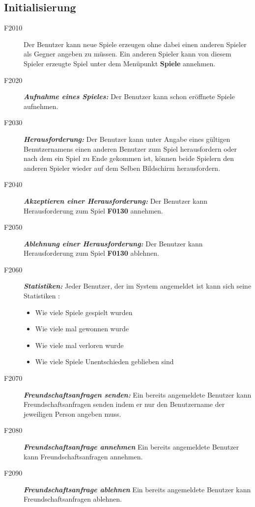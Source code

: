 \documentclass[parskip=full]{scrartcl}
\begin{document}
\subsection{Initialisierung}
\begin{description}
	\item[F2010] Der Benutzer kann neue Spiele erzeugen ohne dabei einen anderen \gls{Spieler} als Gegner angeben zu müssen. Ein anderen Spieler kann von diesem Spieler erzeugte Spiel unter dem Menüpunkt \textbf{Spiele} annehmen.
	\item[F2020] \textbf{\textit{Aufnahme eines Spieles: }} Der Benutzer kann schon eröffnete Spiele aufnehmen.
	\item[F2030] \textbf{\textit{Herausforderung: }} Der Benutzer kann unter Angabe eines gültigen Benutzernamens einen anderen Benutzer zum Spiel herausfordern oder nach dem ein Spiel zu Ende gekommen ist, können beide Spielern den anderen Spieler wieder auf dem Selben Bildschirm herausfordern.
	\item [F2040] \textbf{\textit{Akzeptieren einer Herausforderung: }} Der Benutzer kann Herausforderung zum Spiel \textbf{F0130} annehmen.
	\item [F2050] \textbf{\textit{Ablehnung einer Herausforderung: }} Der Benutzer kann Herausforderung zum Spiel \textbf{F0130} ablehnen.
	\item [F2060] \textbf{\textit{Statistiken: }} Jeder Benutzer, der im System angemeldet ist kann sich seine Statistiken :
	\begin{itemize}
		\item Wie viele Spiele gespielt wurden
		\item Wie viele mal gewonnen wurde
		\item Wie viele mal verloren wurde
		\item Wie viele Spiele Unentschieden geblieben sind
	\end{itemize}
	\item[F2070] \textbf{\textit{Freundschaftsanfragen senden: }}
	Ein bereits angemeldete Benutzer kann Freundschaftsanfragen senden indem er nur den Benutzername der jeweiligen Person angeben muss.
	\item[F2080] \textbf{\textit{Freundschaftsanfrage annehmen }} Ein bereits angemeldete Benutzer kann Freundschaftsanfragen annehmen.
	\item[F2090] \textbf{\textit{Freundschaftsanfrage ablehnen }} Ein bereits angemeldete Benutzer kann Freundschaftsanfragen ablehnen.
	
\end{description}
\end{document}
